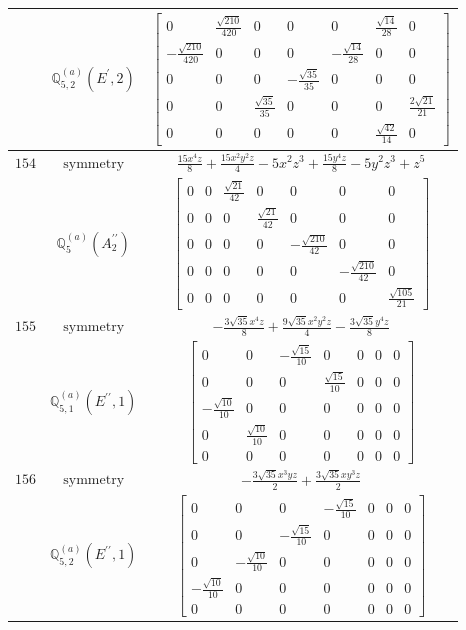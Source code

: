 \documentclass[fleqn,8pt,landscape]{jsarticle}
\begin{document}
\begin{longtable}{ccc}
$  $ & $ \mathbb{Q}_{5,2}^{(a)}(E^{\prime},2) $ & $ \begin{bmatrix} 0 & \frac{\sqrt{210}}{420} & 0 & 0 & 0 & \frac{\sqrt{14}}{28} & 0 \\ - \frac{\sqrt{210}}{420} & 0 & 0 & 0 & - \frac{\sqrt{14}}{28} & 0 & 0 \\ 0 & 0 & 0 & - \frac{\sqrt{35}}{35} & 0 & 0 & 0 \\ 0 & 0 & \frac{\sqrt{35}}{35} & 0 & 0 & 0 & \frac{2 \sqrt{21}}{21} \\ 0 & 0 & 0 & 0 & 0 & \frac{\sqrt{42}}{14} & 0 \end{bmatrix} $ \\ \hline
$ 154 $ & $ \text{symmetry} $ & $ \frac{15 x^{4} z}{8} + \frac{15 x^{2} y^{2} z}{4} - 5 x^{2} z^{3} + \frac{15 y^{4} z}{8} - 5 y^{2} z^{3} + z^{5} $ \\
$  $ & $ \mathbb{Q}_{5}^{(a)}(A_{2}^{\prime\prime}) $ & $ \begin{bmatrix} 0 & 0 & \frac{\sqrt{21}}{42} & 0 & 0 & 0 & 0 \\ 0 & 0 & 0 & \frac{\sqrt{21}}{42} & 0 & 0 & 0 \\ 0 & 0 & 0 & 0 & - \frac{\sqrt{210}}{42} & 0 & 0 \\ 0 & 0 & 0 & 0 & 0 & - \frac{\sqrt{210}}{42} & 0 \\ 0 & 0 & 0 & 0 & 0 & 0 & \frac{\sqrt{105}}{21} \end{bmatrix} $ \\ \hline
$ 155 $ & $ \text{symmetry} $ & $ - \frac{3 \sqrt{35} x^{4} z}{8} + \frac{9 \sqrt{35} x^{2} y^{2} z}{4} - \frac{3 \sqrt{35} y^{4} z}{8} $ \\
$  $ & $ \mathbb{Q}_{5,1}^{(a)}(E^{\prime\prime},1) $ & $ \begin{bmatrix} 0 & 0 & - \frac{\sqrt{15}}{10} & 0 & 0 & 0 & 0 \\ 0 & 0 & 0 & \frac{\sqrt{15}}{10} & 0 & 0 & 0 \\ - \frac{\sqrt{10}}{10} & 0 & 0 & 0 & 0 & 0 & 0 \\ 0 & \frac{\sqrt{10}}{10} & 0 & 0 & 0 & 0 & 0 \\ 0 & 0 & 0 & 0 & 0 & 0 & 0 \end{bmatrix} $ \\ \hline
$ 156 $ & $ \text{symmetry} $ & $ - \frac{3 \sqrt{35} x^{3} y z}{2} + \frac{3 \sqrt{35} x y^{3} z}{2} $ \\
$  $ & $ \mathbb{Q}_{5,2}^{(a)}(E^{\prime\prime},1) $ & $ \begin{bmatrix} 0 & 0 & 0 & - \frac{\sqrt{15}}{10} & 0 & 0 & 0 \\ 0 & 0 & - \frac{\sqrt{15}}{10} & 0 & 0 & 0 & 0 \\ 0 & - \frac{\sqrt{10}}{10} & 0 & 0 & 0 & 0 & 0 \\ - \frac{\sqrt{10}}{10} & 0 & 0 & 0 & 0 & 0 & 0 \\ 0 & 0 & 0 & 0 & 0 & 0 & 0 \end{bmatrix} $ \\ \hline

\end{longtable}
\end{document}
